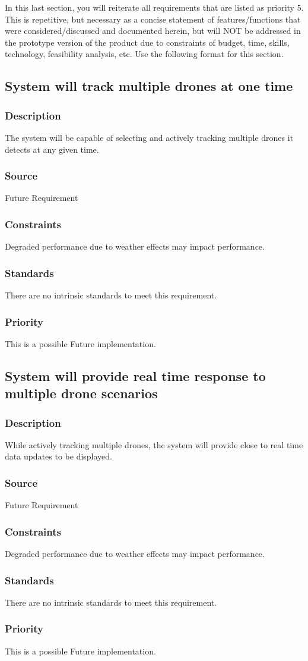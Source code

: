 In this last section, you will reiterate all requirements that are listed as priority 5. This is repetitive, but necessary as a concise statement of features/functions that were considered/discussed and documented herein, but will NOT be addressed in the prototype version of the product due to constraints of budget, time, skills, technology, feasibility analysis, etc. Use the following format for this section.

\subsection{System will track multiple drones at one time}
\subsubsection{Description}
The system will be capable of selecting and actively tracking multiple drones it detects at any given time.
\subsubsection{Source}
Future Requirement
\subsubsection{Constraints}
Degraded performance due to weather effects may impact performance.
\subsubsection{Standards}
There are no intrinsic standards to meet this requirement.
\subsubsection{Priority}
This is a possible Future implementation.

\subsection{System will provide real time response to multiple drone scenarios}
\subsubsection{Description}
While actively tracking multiple drones, the system will provide close to real time data updates to be displayed.
\subsubsection{Source}
Future Requirement
\subsubsection{Constraints}
Degraded performance due to weather effects may impact performance.
\subsubsection{Standards}
There are no intrinsic standards to meet this requirement.
\subsubsection{Priority}
This is a possible Future implementation.